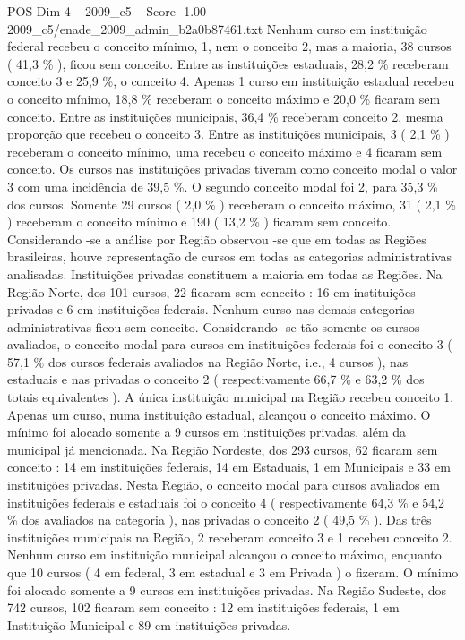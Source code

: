 \begin{textsample}{POS Dim 4 – 2009\_c5 – Score -1.00 – 2009\_c5/enade\_2009\_admin\_b2a0b87461.txt}
Nenhum curso em instituição federal recebeu o conceito mínimo, 1, nem o conceito 2, mas a maioria, 38 cursos ( 41,3 \% ), ficou sem conceito.
Entre as instituições estaduais, 28,2 \% receberam conceito 3 e 25,9 \%, o conceito 4.
Apenas 1 curso em instituição estadual recebeu o conceito mínimo, 18,8 \% receberam o conceito máximo e 20,0 \% ficaram sem conceito.
Entre as instituições municipais, 36,4 \% receberam conceito 2, mesma proporção que recebeu o conceito 3.
Entre as instituições municipais, 3 ( 2,1 \% ) receberam o conceito mínimo, uma recebeu o conceito máximo e 4 ficaram sem conceito.
Os cursos nas instituições privadas tiveram como conceito modal o valor 3 com uma incidência de 39,5 \%.
O segundo conceito modal foi 2, para 35,3 \% dos cursos.
Somente 29 cursos ( 2,0 \% ) receberam o conceito máximo, 31 ( 2,1 \% ) receberam o conceito mínimo e 190 ( 13,2 \% ) ficaram sem conceito.
Considerando -se a análise por Região observou -se que em todas as Regiões brasileiras, houve representação de cursos em todas as categorias administrativas analisadas.
Instituições privadas constituem a maioria em todas as Regiões.
Na Região Norte, dos 101 cursos, 22 ficaram sem conceito : 16 em instituições privadas e 6 em instituições federais.
Nenhum curso nas demais categorias administrativas ficou sem conceito.
Considerando -se tão somente os cursos avaliados, o conceito modal para cursos em instituições federais foi o conceito 3 ( 57,1 \% dos cursos federais avaliados na Região Norte, i.e., 4 cursos ), nas estaduais e nas privadas o conceito 2 ( respectivamente 66,7 \% e 63,2 \% dos totais equivalentes ).
A única instituição municipal na Região recebeu conceito 1.
Apenas um curso, numa instituição estadual, alcançou o conceito máximo.
O mínimo foi alocado somente a 9 cursos em instituições privadas, além da municipal já mencionada.
Na Região Nordeste, dos 293 cursos, 62 ficaram sem conceito : 14 em instituições federais, 14 em Estaduais, 1 em Municipais e 33 em instituições privadas.
Nesta Região, o conceito modal para cursos avaliados em instituições federais e estaduais foi o conceito 4 ( respectivamente 64,3 \% e 54,2 \% dos avaliados na categoria ), nas privadas o conceito 2 ( 49,5 \% ).
Das três instituições municipais na Região, 2 receberam conceito 3 e 1 recebeu conceito 2.
Nenhum curso em instituição municipal alcançou o conceito máximo, enquanto que 10 cursos ( 4 em federal, 3 em estadual e 3 em Privada ) o fizeram.
O mínimo foi alocado somente a 9 cursos em instituições privadas.
Na Região Sudeste, dos 742 cursos, 102 ficaram sem conceito : 12 em instituições federais, 1 em Instituição Municipal e 89 em instituições privadas.

\end{textsample}
